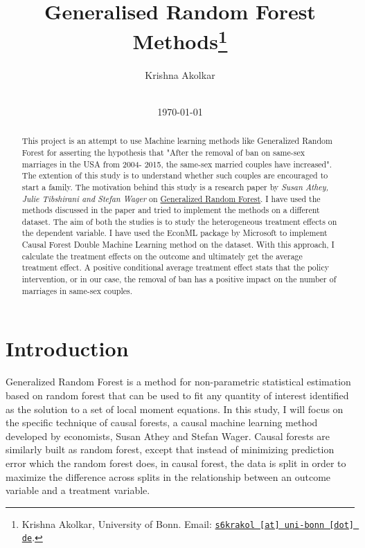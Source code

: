 \documentclass[11pt, a4paper, leqno]{article}
\begin{document}
\title{Generalised Random Forest Methods\thanks{Krishna Akolkar, University of Bonn. Email: \href{mailto:s6krakol@uni-bonn.de}{\nolinkurl{s6krakol [at] uni-bonn [dot] de}}.}}

\author{Krishna Akolkar}

\date{
    \\[1ex]
    \today
}

\maketitle


\begin{abstract}
    This project is an attempt to use Machine learning methods like Generalized Random Forest for asserting the hypothesis that
    "After the removal of ban on same-sex marriages in the USA from 2004- 2015, the same-sex married couples have increased".
    The extention of this study is to understand whether such couples are encouraged to start a family. The motivation behind this 
    study is a research paper by \textit{Susan Athey, Julie Tibshirani and Stefan Wager} on
     \href{https://arxiv.org/pdf/1610.01271}{Generalized Random Forest}. I have used the methods discussed in the paper and tried 
    to implement the methods on a different dataset. The aim of both the studies is to study the heterogeneous treatment effects on 
    the dependent variable. I have used the EconML package by Microsoft to implement Causal Forest Double Machine Learning method on 
    the dataset. With this approach, I calculate the treatment effects on the outcome and ultimately get the average treatment effect. 
    A positive conditional average treatment effect stats that the policy intervention, or in our case, the removal of ban has a positive 
    impact on the number of marriages in same-sex couples.
\end{abstract}

\clearpage


\section{Introduction} %
\label{sec:introduction}

 Generalized Random Forest is a method for non-parametric statistical estimation based on random forest that can be used to fit any quantity 
 of interest identified as the solution to a set of local moment equations. In this study, I will focus on the specific technique of causal 
 forests, a causal machine learning method developed by economists, Susan Athey and Stefan Wager. Causal forests are similarly built as random 
 forest, except that instead of minimizing prediction error which the random forest does, in causal forest, the data is split in order to 
 maximize the difference across splits in the relationship between an outcome variable and a treatment variable. 
\end{document}
